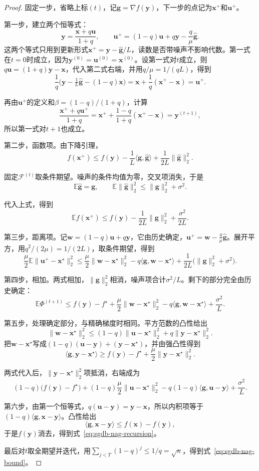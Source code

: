 \begin{proof}
固定一步，省略上标$(t)$，记$\bm{g}=\nabla f(\bm{y})$，下一步的点记为$\bm{x}^+$和$\bm{u}^+$。

第一步，建立两个恒等式：
\[
 \bm{y}=\frac{\bm{x}+q\bm{u}}{1+q},\qquad
 \bm{u}^+=(1-q)\bm{u}+q\bm{y}-\frac q\mu\hat{\bm g}.
\]
这两个等式只用到更新形式$\bm{x}^+=\bm{y}-\hat{\bm g}/L$，读数是否带噪声不影响代数。第一式在$t=0$时成立，因为$\bm{y}^{(0)}=\bm{u}^{(0)}=\bm{x}^{(0)}$。设第一式对$t$成立，则$q\bm{u}=(1+q)\bm{y}-\bm{x}$，代入第二式右端，并用$q/\mu=1/(qL)$，得到
\[
 \frac1q\bigl(\bm{y}-\tfrac1L\hat{\bm g}-(1-q)\bm{x}\bigr)
 =\bm{x}+\frac1q(\bm{x}^+-\bm{x})=\bm{u}^+ .
\]

再由$\bm{u}^+$的定义和$\beta=(1-q)/(1+q)$，计算
\[
 \frac{\bm{x}^++q\bm{u}^+}{1+q}=\bm{x}^++\frac{1-q}{1+q}(\bm{x}^+-\bm{x})=\bm{y}^{(t+1)},
\]
所以第一式对$t+1$也成立。

第二步，函数项。由下降引理，
\[
 f(\bm{x}^+)\leq f(\bm{y})-\frac1L\langle\bm{g},\hat{\bm g}\rangle+\frac{1}{2L}\lVert\hat{\bm g}\rVert_2^2 .
\]

固定$\mathcal{F}^{(t)}$取条件期望。噪声的条件均值为零，交叉项消失，于是
\[
 \mathbb{E}\hat{\bm g}=\bm{g},\qquad
 \mathbb{E}\lVert\hat{\bm g}\rVert_2^2\leq\lVert\bm{g}\rVert_2^2+\sigma^2 .
\]

代入上式，得到
\[
 \mathbb{E}f(\bm{x}^+)\leq f(\bm{y})-\frac{1}{2L}\lVert\bm{g}\rVert_2^2+\frac{\sigma^2}{2L}.
\]

第三步，距离项。记$\bm{w}=(1-q)\bm{u}+q\bm{y}$，它由历史确定，$\bm{u}^+=\bm{w}-\frac q\mu\hat{\bm g}$。展开平方，用$q^2/(2\mu)=1/(2L)$，取条件期望，得到
\[
 \frac\mu2\mathbb{E}\lVert\bm{u}^+-\bm{x}^\star\rVert_2^2
 \leq\frac\mu2\lVert\bm{w}-\bm{x}^\star\rVert_2^2-q\langle\bm{g},\bm{w}-\bm{x}^\star\rangle+\frac{1}{2L}\bigl(\lVert\bm{g}\rVert_2^2+\sigma^2\bigr).
\]

第四步，相加。两式相加，$\lVert\bm{g}\rVert_2^2$相消，噪声项合计$\sigma^2/L$。剩下的部分完全由历史确定：
\[
 \mathbb{E}\Phi^{(t+1)}\leq f(\bm{y})-f^\star+\frac\mu2\lVert\bm{w}-\bm{x}^\star\rVert_2^2-q\langle\bm{g},\bm{w}-\bm{x}^\star\rangle+\frac{\sigma^2}{L}.
\]

第五步，处理确定部分，与精确梯度时相同。平方范数的凸性给出
\[
 \lVert\bm{w}-\bm{x}^\star\rVert_2^2\leq(1-q)\lVert\bm{u}-\bm{x}^\star\rVert_2^2+q\lVert\bm{y}-\bm{x}^\star\rVert_2^2 .
\]
把$\bm{w}-\bm{x}^\star$写成$(1-q)(\bm{u}-\bm{y})+(\bm{y}-\bm{x}^\star)$，并由强凸性得到
\[
 \langle\bm{g},\bm{y}-\bm{x}^\star\rangle\geq f(\bm{y})-f^\star+\frac\mu2\lVert\bm{y}-\bm{x}^\star\rVert_2^2 .
\]

两式代入后，$\lVert\bm{y}-\bm{x}^\star\rVert_2^2$项抵消，右端成为
\[
 (1-q)\bigl(f(\bm{y})-f^\star\bigr)+(1-q)\frac\mu2\lVert\bm{u}-\bm{x}^\star\rVert_2^2-q(1-q)\langle\bm{g},\bm{u}-\bm{y}\rangle+\frac{\sigma^2}{L}.
\]

第六步，由第一个恒等式，$q(\bm{u}-\bm{y})=\bm{y}-\bm{x}$，所以内积项等于$(1-q)\langle\bm{g},\bm{x}-\bm{y}\rangle$。凸性给出
\[
 \langle\bm{g},\bm{x}-\bm{y}\rangle\leq f(\bm{x})-f(\bm{y}),
\]
于是$f(\bm{y})$消去，得到式~\eqref{eq:sgdb-nag-recursion}。

最后对$t$取全期望并迭代，用$\sum_{j<T}(1-q)^j\leq1/q=\sqrt\kappa$，得到式~\eqref{eq:sgdb-nag-bound}。
\end{proof}

